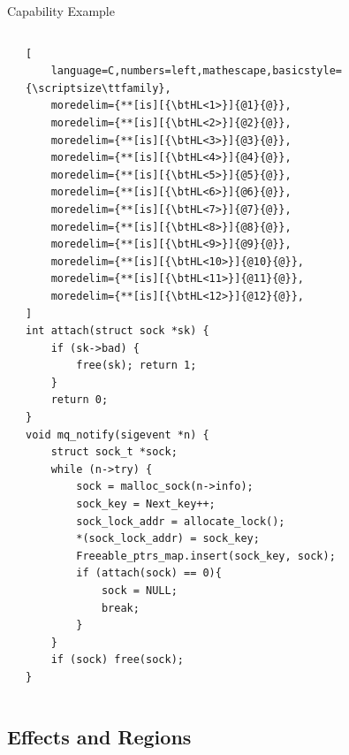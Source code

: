 \documentclass[aspectratio=169]{beamer}
\begin{document}
\begin{frame}[fragile]{Capability Example}

\begin{columns}[T]
\begin{column}{0.48\textwidth}
\end{column}
\begin{column}{0.48\textwidth}
\begin{lstlisting}[
    language=C,numbers=left,mathescape,basicstyle={\scriptsize\ttfamily},
    moredelim={**[is][{\btHL<1>}]{@1}{@}},
    moredelim={**[is][{\btHL<2>}]{@2}{@}},
    moredelim={**[is][{\btHL<3>}]{@3}{@}},
    moredelim={**[is][{\btHL<4>}]{@4}{@}},
    moredelim={**[is][{\btHL<5>}]{@5}{@}},
    moredelim={**[is][{\btHL<6>}]{@6}{@}},
    moredelim={**[is][{\btHL<7>}]{@7}{@}},
    moredelim={**[is][{\btHL<8>}]{@8}{@}},
    moredelim={**[is][{\btHL<9>}]{@9}{@}},
    moredelim={**[is][{\btHL<10>}]{@10}{@}},
    moredelim={**[is][{\btHL<11>}]{@11}{@}},
    moredelim={**[is][{\btHL<12>}]{@12}{@}},
]
int attach(struct sock *sk) {
    if (sk->bad) {
        free(sk); return 1;
    }
    return 0;
}
void mq_notify(sigevent *n) {
    struct sock_t *sock;
    while (n->try) {
        sock = malloc_sock(n->info);
        sock_key = Next_key++;
        sock_lock_addr = allocate_lock();
        *(sock_lock_addr) = sock_key;
        Freeable_ptrs_map.insert(sock_key, sock);
        if (attach(sock) == 0){
            sock = NULL;
            break;
        }
    }
    if (sock) free(sock);
}
\end{lstlisting}
\end{column}
\end{columns}
\end{frame}

\subsection{Effects and Regions}

\end{document}
